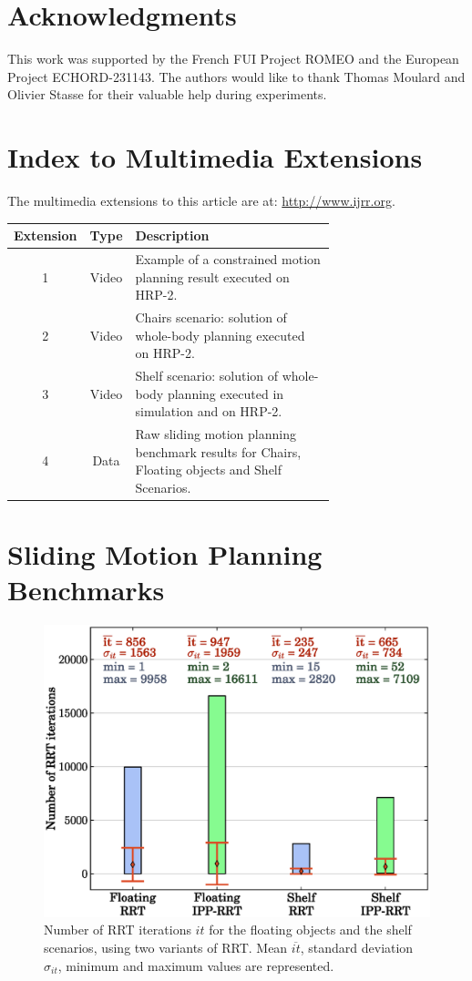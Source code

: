\documentclass{article}
\begin{document}
\section{Acknowledgments}

This work was supported by the French FUI Project ROMEO and the European Project ECHORD-231143. The authors would like to thank Thomas Moulard and Olivier Stasse for their valuable help during experiments.

\appendix
\section{Index to Multimedia Extensions}

The multimedia extensions to this article are at:
\url{http://www.ijrr.org}.

\begin{table}[H]
\begin{tabular}{c c m{0.7\linewidth}}
\hline
Extension & Type & Description \\
\hline
1 & Video & Example of a constrained motion planning result executed
on HRP-2. \\
2 & Video & Chairs scenario: solution of whole-body planning executed
on HRP-2. \\
3 & Video & Shelf scenario: solution of whole-body planning executed
in simulation and on HRP-2. \\
4 & Data & Raw sliding motion planning benchmark results for Chairs,
Floating objects and Shelf Scenarios. \\
\hline
\end{tabular}
\end{table}

\section{Sliding Motion Planning Benchmarks}
\label{app:bench}

\begin{figure}[H]
\centering
\includegraphics[width=0.8\linewidth]{plots/rrt-it.eps}
\caption{Number of RRT iterations $it$ for the floating objects and the
  shelf scenarios, using two variants of RRT. Mean $\overline{it}$,
  standard deviation $\sigma_{it}$, minimum and maximum values are
  represented.}
\label{fig:rrt-it}
\end{figure}
\end{document}
